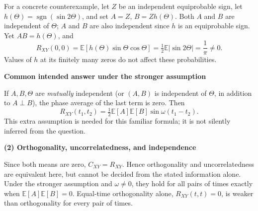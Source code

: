 \documentclass[a4paper,11pt]{article}
\newcommand{\E}{\mathbb E}\newcommand{\Var}{\operatorname{Var}}\newcommand{\Cov}{\operatorname{Cov}}
\newcommand{\step}[1]{\par\textbf{#1}\par}
\begin{document}
For a concrete counterexample, let $Z$ be an independent equiprobable sign, let
$h(\Theta)=\operatorname{sgn}(\sin2\Theta)$, and set $A=Z$, $B=Zh(\Theta)$.
Both $A$ and $B$ are independent of $\Theta$; $A$ and $B$ are also independent since $h$ is an equiprobable sign. Yet $AB=h(\Theta)$, and
\[
R_{XY}(0,0)=\E[h(\Theta)\sin\Theta\cos\Theta]
=\tfrac12\E|\sin2\Theta|=\frac1\pi\ne0.
\]
Values of $h$ at its finitely many zeros do not affect these probabilities.
\step{Common intended answer under the stronger assumption}
If $A,B,\Theta$ are \emph{mutually} independent (or $(A,B)$ is independent of $\Theta$, in addition to $A\perp B$), the phase average of the last term is zero. Then
\[
\boxed{R_{XY}(t_1,t_2)=\tfrac12\E[A]\E[B]\sin\omega(t_1-t_2).}
\]
This extra assumption is needed for this familiar formula; it is not silently inferred from the question.
\step{(2) Orthogonality, uncorrelatedness, and independence}
Since both means are zero, $C_{XY}=R_{XY}$. Hence orthogonality and uncorrelatedness are equivalent here, but cannot be decided from the stated information alone. Under the stronger assumption and $\omega\ne0$, they hold for all pairs of times exactly when $\E[A]\E[B]=0$.
Equal-time orthogonality alone, $R_{XY}(t,t)=0$, is weaker than orthogonality for every pair of times.
\end{document}
